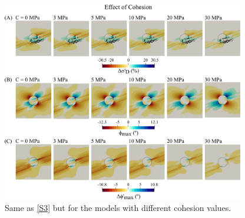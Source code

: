 \documentclass[draft,jgrga]{agutexSI2019}
\begin{document}
\begin{article}
\begin{figure}[ht]
\includegraphics[width=25pc]{Figures/SD70R25C_S2.png}
\caption{Same as \ref{S3} but for the models with different cohesion values.}
\label{S6}
\end{figure}

\vspace{10mm} %


\pagebreak






















%


\end{article}
\end{document}
